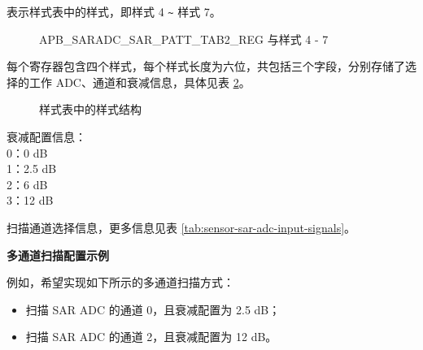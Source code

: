 \documentclass[main\_\_CN.tex]{subfiles}
\begin{document}
%
%
%
%
%
\begin{regdesc}\begin{reglist}
\item [cmd \regindex{x}] 表示样式表中的样式，即样式 4 \verb+~+ 样式 7。
\end{reglist}\end{regdesc}
\vspace{-2em}
\begin{figure}[H]
    \centering
    \caption{APB\_SARADC\_SAR\_PATT\_TAB2\_REG 与样式 4 - 7}
    \label{fig:sensor-apb-saradc-sar-patt-tab2-reg-pattern-tab-entry4-entry7}
\end{figure}

每个寄存器包含四个样式，每个样式长度为六位，共包括三个字段，分别存储了选择的工作 ADC、通道和衰减信息，具体见表 \ref{fig:sensor-pattern-table-entry}。


\begin{figure}[H]
\centering
{}%
%
%
\end{figure}
\vspace{-2em}
\begin{figure}[H]
    \centering
    \caption{样式表中的样式结构}
    \label{fig:sensor-pattern-table-entry}
\end{figure}
\vspace{-2em}
\begin{regdesc}\begin{reglist}
\item [atten] 衰减配置信息：\\
0：0 dB\\
1：2.5 dB\\
2：6 dB\\
3：12 dB
\item [ch\_sel] 扫描通道选择信息，更多信息见表 \ref{tab:sensor-sar-adc-input-signals}。
\end{reglist}\end{regdesc}

\textbf{多通道扫描配置示例}

例如，希望实现如下所示的多通道扫描方式：
\begin{itemize}
    \item 扫描 SAR ADC 的通道 0，且衰减配置为 2.5 dB；    
    \item 扫描 SAR ADC 的通道 2，且衰减配置为 12 dB。
\end{itemize}
\end{document}
